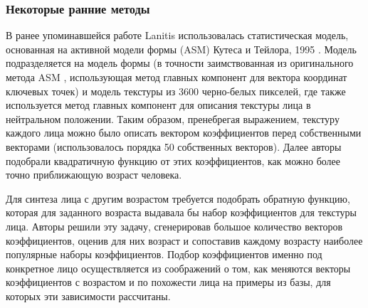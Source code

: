 \subsubsection{Некоторые ранние методы}
В ранее упоминавшейся работе Lanitis \cite{lanitis} использовалась статистическая модель, основанная на активной модели формы (ASM) Кутеса и Тейлора, 1995 \cite{asm}. Модель подразделяется на модель формы (в точности заимствованная из оригинального метода ASM \cite{asm}, использующая метод главных компонент для вектора координат ключевых точек) и модель текстуры из 3600 черно-белых пикселей, где также используется метод главных компонент для описания текстуры лица в нейтральном положении. Таким образом, пренебрегая выражением, текстуру каждого лица можно было описать вектором коэффициентов перед собственными векторами (использовалось порядка 50 собственных векторов). Далее авторы подобрали квадратичную функцию от этих коэффициентов, как можно более точно приближающую возраст человека.

Для синтеза лица с другим возрастом требуется подобрать обратную функцию, которая для заданного возраста выдавала бы набор коэффициентов для текстуры лица. Авторы решили эту задачу, сгенерировав большое количество векторов коэффициентов, оценив для них возраст и сопоставив каждому возрасту наиболее популярные наборы коэффициентов. Подбор коэффициентов именно под конкретное лицо осуществляется из соображений о том, как меняются векторы коэффициентов с возрастом и по похожести лица на примеры из базы, для которых эти зависимости рассчитаны.

